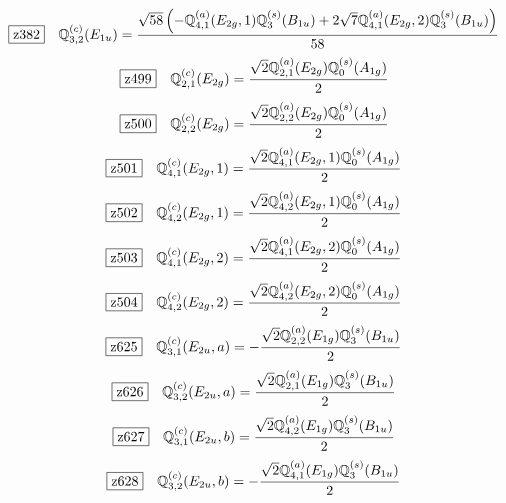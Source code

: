 \documentclass[fleqn,10pt,landscape]{jsarticle}
\begin{document}
\begin{dmath*}
\hspace*{3mm}\fbox{z382}\quad \mathbb{Q}_{3,2}^{(c)}(E_{1u})=\frac{\sqrt{58} \left(- \mathbb{Q}_{4,1}^{(a)}(E_{2g},1) \mathbb{Q}_{3}^{(s)}(B_{1u}) + 2 \sqrt{7} \mathbb{Q}_{4,1}^{(a)}(E_{2g},2) \mathbb{Q}_{3}^{(s)}(B_{1u})\right)}{58}
\end{dmath*}
\begin{dmath*}
\hspace*{3mm}\fbox{z499}\quad \mathbb{Q}_{2,1}^{(c)}(E_{2g})=\frac{\sqrt{2} \mathbb{Q}_{2,1}^{(a)}(E_{2g}) \mathbb{Q}_{0}^{(s)}(A_{1g})}{2}
\end{dmath*}
\begin{dmath*}
\hspace*{3mm}\fbox{z500}\quad \mathbb{Q}_{2,2}^{(c)}(E_{2g})=\frac{\sqrt{2} \mathbb{Q}_{2,2}^{(a)}(E_{2g}) \mathbb{Q}_{0}^{(s)}(A_{1g})}{2}
\end{dmath*}
\begin{dmath*}
\hspace*{3mm}\fbox{z501}\quad \mathbb{Q}_{4,1}^{(c)}(E_{2g},1)=\frac{\sqrt{2} \mathbb{Q}_{4,1}^{(a)}(E_{2g},1) \mathbb{Q}_{0}^{(s)}(A_{1g})}{2}
\end{dmath*}
\begin{dmath*}
\hspace*{3mm}\fbox{z502}\quad \mathbb{Q}_{4,2}^{(c)}(E_{2g},1)=\frac{\sqrt{2} \mathbb{Q}_{4,2}^{(a)}(E_{2g},1) \mathbb{Q}_{0}^{(s)}(A_{1g})}{2}
\end{dmath*}
\begin{dmath*}
\hspace*{3mm}\fbox{z503}\quad \mathbb{Q}_{4,1}^{(c)}(E_{2g},2)=\frac{\sqrt{2} \mathbb{Q}_{4,1}^{(a)}(E_{2g},2) \mathbb{Q}_{0}^{(s)}(A_{1g})}{2}
\end{dmath*}
\begin{dmath*}
\hspace*{3mm}\fbox{z504}\quad \mathbb{Q}_{4,2}^{(c)}(E_{2g},2)=\frac{\sqrt{2} \mathbb{Q}_{4,2}^{(a)}(E_{2g},2) \mathbb{Q}_{0}^{(s)}(A_{1g})}{2}
\end{dmath*}
\begin{dmath*}
\hspace*{3mm}\fbox{z625}\quad \mathbb{Q}_{3,1}^{(c)}(E_{2u},a)=- \frac{\sqrt{2} \mathbb{Q}_{2,2}^{(a)}(E_{1g}) \mathbb{Q}_{3}^{(s)}(B_{1u})}{2}
\end{dmath*}
\begin{dmath*}
\hspace*{3mm}\fbox{z626}\quad \mathbb{Q}_{3,2}^{(c)}(E_{2u},a)=\frac{\sqrt{2} \mathbb{Q}_{2,1}^{(a)}(E_{1g}) \mathbb{Q}_{3}^{(s)}(B_{1u})}{2}
\end{dmath*}
\begin{dmath*}
\hspace*{3mm}\fbox{z627}\quad \mathbb{Q}_{3,1}^{(c)}(E_{2u},b)=\frac{\sqrt{2} \mathbb{Q}_{4,2}^{(a)}(E_{1g}) \mathbb{Q}_{3}^{(s)}(B_{1u})}{2}
\end{dmath*}
\begin{dmath*}
\hspace*{3mm}\fbox{z628}\quad \mathbb{Q}_{3,2}^{(c)}(E_{2u},b)=- \frac{\sqrt{2} \mathbb{Q}_{4,1}^{(a)}(E_{1g}) \mathbb{Q}_{3}^{(s)}(B_{1u})}{2}
\end{dmath*}
\vspace{5mm}
\end{document}
